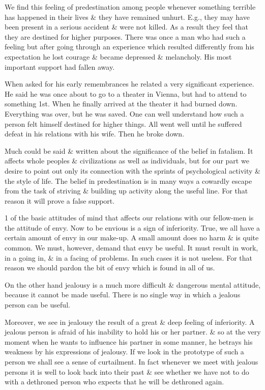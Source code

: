 \documentclass{article}
\numberwithin{equation}{section}
\begin{document}
We find this feeling of predestination among people whenever something terrible has happened in their lives \& they have remained unhurt. E.g., they may have been present in a serious accident \& were not killed. As a result they feel that they are destined for higher purposes. There was once a man who had such a feeling but after going through an experience which resulted differently from his expectation he lost courage \& became depressed \& melancholy. His most important support had fallen away.

When asked for his early remembrances he related a very significant experience. He said he was once about to go to a theater in Vienna, but had to attend to something 1st. When he finally arrived at the theater it had burned down. Everything was over, but he was saved. One can well understand how such a person felt himself destined for higher things. All went well until he suffered defeat in his relations with his wife. Then he broke down.

Much could be said \& written about the significance of the belief in fatalism. It affects whole peoples \& civilizations as well as individuals, but for our part we desire to point out only its connection with the sprints of psychological activity \& the style of life. The belief in predestination is in many ways a cowardly escape from the task of striving \& building up activity along the useful line. For that reason it will prove a false support.

1 of the basic attitudes of mind that affects our relations with our fellow-men is the attitude of envy. Now to be envious is a sign of inferiority. True, we all have a certain amount of envy in our make-up. A small amount does no harm \& is quite common. We must, however, demand that envy be useful. It must result in work, in a going in, \& in a facing of problems. In such cases it is not useless. For that reason we should pardon the bit of envy which is found in all of us.

On the other hand jealousy is a much more difficult \& dangerous mental attitude, because it cannot be made useful. There is no single way in which a jealous person can be useful.

Moreover, we see in jealousy the result of a great \& deep feeling of inferiority. A jealous person is afraid of his inability to hold his or her partner. \& so at the very moment when he wants to influence his partner in some manner, he betrays his weakness by his expressions of jealousy. If we look in the prototype of such a person we shall see a sense of curtailment. In fact whenever we meet with jealous persons it is well to look back into their past \& see whether we have not to do with a dethroned person who expects that he will be dethroned again.
\end{document}
